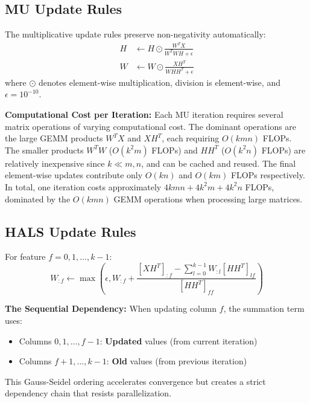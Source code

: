\documentclass[11pt]{article}
\begin{document}
\subsection{MU Update Rules}
The multiplicative update rules preserve non-negativity automatically:
\begin{align}
    H &\leftarrow H \odot \frac{W^T X}{W^T W H + \epsilon} \\
    W &\leftarrow W \odot \frac{X H^T}{W H H^T + \epsilon}
\end{align}
where $\odot$ denotes element-wise multiplication, division is element-wise, and $\epsilon = 10^{-10}$.

\textbf{Computational Cost per Iteration:}
Each MU iteration requires several matrix operations of varying computational cost. The dominant operations are the large GEMM products $W^T X$ and $X H^T$, each requiring $O(kmn)$ FLOPs. The smaller products $W^T W$ ($O(k^2 m)$ FLOPs) and $H H^T$ ($O(k^2 n)$ FLOPs) are relatively inexpensive since $k \ll m, n$, and can be cached and reused. The final element-wise updates contribute only $O(kn)$ and $O(km)$ FLOPs respectively. In total, one iteration costs approximately $4kmn + 4k^2m + 4k^2n$ FLOPs, dominated by the $O(kmn)$ GEMM operations when processing large matrices.

\subsection{HALS Update Rules}
For feature $f = 0, 1, \ldots, k-1$:
\begin{equation}
    W_{:f} \leftarrow \max \left( \epsilon, W_{:f} + \frac{[X H^T]_{:f} - \sum_{l=0}^{k-1} W_{:l} [H H^T]_{lf}}{[H H^T]_{ff}} \right)
\end{equation}

\textbf{The Sequential Dependency:} When updating column $f$, the summation term uses:
\begin{itemize}
    \item Columns $0, 1, \ldots, f-1$: \textbf{Updated} values (from current iteration)
    \item Columns $f+1, \ldots, k-1$: \textbf{Old} values (from previous iteration)
\end{itemize}

This Gauss-Seidel ordering accelerates convergence but creates a strict dependency chain that resists parallelization.

\end{document}

